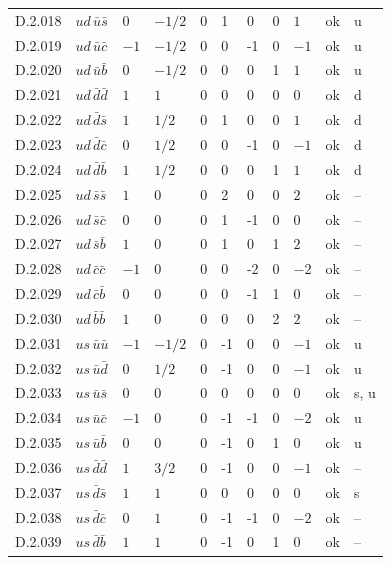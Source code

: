 {\begin{longtable}{@{}llllllllll>{\raggedright\arraybackslash}p{2.0cm}@{}}
D.2.018 & $ud\,\bar{u}\bar{s}$ & $0$ & $-1/2$ & $0$ & 1 & 0 & 0 & $1$ & ok & u \\
D.2.019 & $ud\,\bar{u}\bar{c}$ & $-1$ & $-1/2$ & $0$ & 0 & -1 & 0 & $-1$ & ok & u \\
D.2.020 & $ud\,\bar{u}\bar{b}$ & $0$ & $-1/2$ & $0$ & 0 & 0 & 1 & $1$ & ok & u \\
D.2.021 & $ud\,\bar{d}\bar{d}$ & $1$ & $1$ & $0$ & 0 & 0 & 0 & $0$ & ok & d \\
D.2.022 & $ud\,\bar{d}\bar{s}$ & $1$ & $1/2$ & $0$ & 1 & 0 & 0 & $1$ & ok & d \\
D.2.023 & $ud\,\bar{d}\bar{c}$ & $0$ & $1/2$ & $0$ & 0 & -1 & 0 & $-1$ & ok & d \\
D.2.024 & $ud\,\bar{d}\bar{b}$ & $1$ & $1/2$ & $0$ & 0 & 0 & 1 & $1$ & ok & d \\
D.2.025 & $ud\,\bar{s}\bar{s}$ & $1$ & $0$ & $0$ & 2 & 0 & 0 & $2$ & ok & -- \\
D.2.026 & $ud\,\bar{s}\bar{c}$ & $0$ & $0$ & $0$ & 1 & -1 & 0 & $0$ & ok & -- \\
D.2.027 & $ud\,\bar{s}\bar{b}$ & $1$ & $0$ & $0$ & 1 & 0 & 1 & $2$ & ok & -- \\
D.2.028 & $ud\,\bar{c}\bar{c}$ & $-1$ & $0$ & $0$ & 0 & -2 & 0 & $-2$ & ok & -- \\
D.2.029 & $ud\,\bar{c}\bar{b}$ & $0$ & $0$ & $0$ & 0 & -1 & 1 & $0$ & ok & -- \\
D.2.030 & $ud\,\bar{b}\bar{b}$ & $1$ & $0$ & $0$ & 0 & 0 & 2 & $2$ & ok & -- \\
D.2.031 & $us\,\bar{u}\bar{u}$ & $-1$ & $-1/2$ & $0$ & -1 & 0 & 0 & $-1$ & ok & u \\
D.2.032 & $us\,\bar{u}\bar{d}$ & $0$ & $1/2$ & $0$ & -1 & 0 & 0 & $-1$ & ok & u \\
D.2.033 & $us\,\bar{u}\bar{s}$ & $0$ & $0$ & $0$ & 0 & 0 & 0 & $0$ & ok & s, u \\
D.2.034 & $us\,\bar{u}\bar{c}$ & $-1$ & $0$ & $0$ & -1 & -1 & 0 & $-2$ & ok & u \\
D.2.035 & $us\,\bar{u}\bar{b}$ & $0$ & $0$ & $0$ & -1 & 0 & 1 & $0$ & ok & u \\
D.2.036 & $us\,\bar{d}\bar{d}$ & $1$ & $3/2$ & $0$ & -1 & 0 & 0 & $-1$ & ok & -- \\
D.2.037 & $us\,\bar{d}\bar{s}$ & $1$ & $1$ & $0$ & 0 & 0 & 0 & $0$ & ok & s \\
D.2.038 & $us\,\bar{d}\bar{c}$ & $0$ & $1$ & $0$ & -1 & -1 & 0 & $-2$ & ok & -- \\
D.2.039 & $us\,\bar{d}\bar{b}$ & $1$ & $1$ & $0$ & -1 & 0 & 1 & $0$ & ok & -- \\

\end{longtable}}
